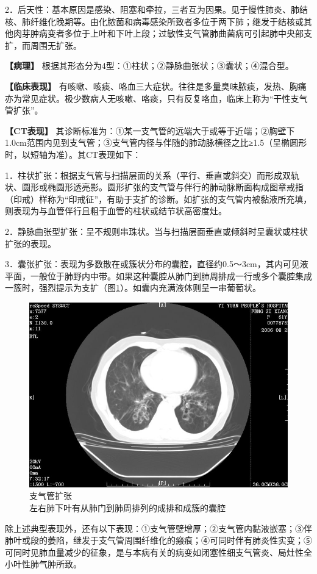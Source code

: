 2．后天性：基本原因是感染、阻塞和牵拉，三者互为因果。见于慢性肺炎、肺结核、肺纤维化晚期等。由化脓菌和病毒感染所致者多位于两下肺；继发于结核或其他肉芽肿病变者多位于上叶和下叶上段；过敏性支气管肺曲菌病可引起肺中央部支扩，而周围无扩张。

\textbf{【病理】}
根据其形态分为4型：①柱状；②静脉曲张状；③囊状；④混合型。

\textbf{【临床表现】}
有咳嗽、咳痰、咯血三大症状。往往是多量臭味脓痰，发热、胸痛亦为常见症状。极少数病人无咳嗽、咯痰，只有反复咯血，临床上称为“干性支气管扩张”。

\textbf{【CT表现】}
其诊断标准为：①某一支气管的远端大于或等于近端；②胸壁下1.0cm范围内见到支气管；③支气管内径与伴随的肺动脉横径之比≥1.5（呈椭圆形时，以短轴为准）。其CT表现如下：

1．柱状扩张：根据支气管与扫描层面的关系（平行、垂直或斜交）而形成双轨状、圆形或椭圆形透亮影。圆形扩张的支气管与伴行的肺动脉断面构成图章戒指（印戒）样称为“印戒征”，有助于支扩的诊断。如扩张的支气管内被黏液所充填，则表现为与血管伴行且粗于血管的柱状或结节状高密度灶。

2．静脉曲张型扩张：呈不规则串珠状。当与扫描层面垂直或倾斜时呈囊状或柱状扩张的表现。

3．囊张扩张：表现为多数散在或簇状分布的囊腔，直径约0.5～3cm，其内可见液平面，一般位于肺野内中带。如果这种囊腔从肺门到肺周排成一行或多个囊腔集成一簇时，强烈提示为支扩（图\ref{fig9-6}）。如囊内充满液体则呈一串葡萄状。

\begin{figure}[!htbp]
 \centering
 \includegraphics[width=.7\textwidth,height=\textheight,keepaspectratio]{./images/Image00189.jpg}
 \captionsetup{justification=centering}
 \caption{支气管扩张\\{\small 左右肺下叶有从肺门到肺周排列的成排和成簇的囊腔}}
 \label{fig9-6}
  \end{figure} 

除上述典型表现外，还有以下表现：①支气管壁增厚；②支气管内黏液嵌塞；③伴肺叶或段的萎陷，继发于支气管周围纤维化的瘢痕；④可同时伴有肺炎性实变；⑤可同时见肺血量减少的征象，是与本病有关的病变如闭塞性细支气管炎、局灶性全小叶性肺气肿所致。

